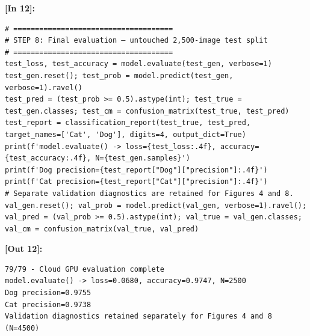 \vspace{0.6em}
\noindent\textbf{\small [In 12]:}
\begin{lstlisting}[style=pycode]
# =====================================
# STEP 8: Final evaluation — untouched 2,500-image test split
# =====================================
test_loss, test_accuracy = model.evaluate(test_gen, verbose=1)
test_gen.reset(); test_prob = model.predict(test_gen, verbose=1).ravel()
test_pred = (test_prob >= 0.5).astype(int); test_true = test_gen.classes; test_cm = confusion_matrix(test_true, test_pred)
test_report = classification_report(test_true, test_pred, target_names=['Cat', 'Dog'], digits=4, output_dict=True)
print(f'model.evaluate() -> loss={test_loss:.4f}, accuracy={test_accuracy:.4f}, N={test_gen.samples}')
print(f'Dog precision={test_report["Dog"]["precision"]:.4f}')
print(f'Cat precision={test_report["Cat"]["precision"]:.4f}')
# Separate validation diagnostics are retained for Figures 4 and 8.
val_gen.reset(); val_prob = model.predict(val_gen, verbose=1).ravel(); val_pred = (val_prob >= 0.5).astype(int); val_true = val_gen.classes; val_cm = confusion_matrix(val_true, val_pred)\end{lstlisting}
\noindent\textbf{\small [Out 12]:}
\begin{lstlisting}[style=output]
79/79 - Cloud GPU evaluation complete
model.evaluate() -> loss=0.0680, accuracy=0.9747, N=2500
Dog precision=0.9755
Cat precision=0.9738
Validation diagnostics retained separately for Figures 4 and 8 (N=4500)
\end{lstlisting}

